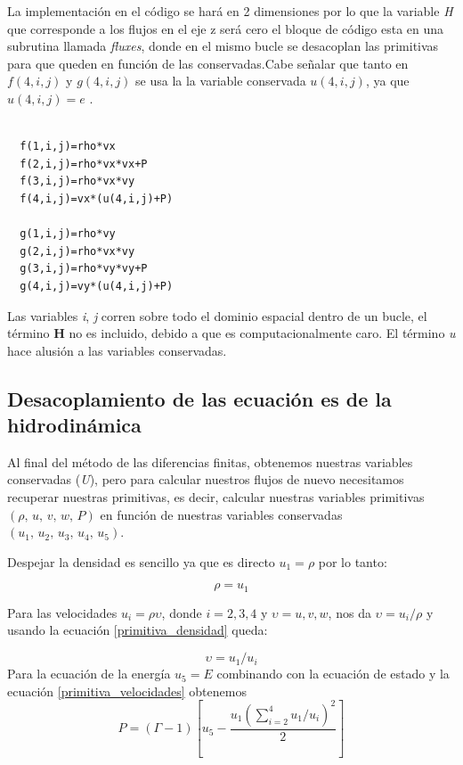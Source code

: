 \documentclass[12pt,a4paper]{book}
\begin{document}
La implementación en el código se hará en 2 dimensiones por lo que la variable \emph{H} que corresponde a los flujos en el eje z será cero el bloque de código esta en una subrutina llamada \emph{fluxes}, 
donde en el mismo bucle se desacoplan las primitivas para que queden en función de las conservadas.Cabe señalar que tanto en $f(4,i,j)$ y $g(4,i,j)$ se usa la
la variable conservada $u(4,i,j)$, ya que $u(4,i,j) = e$ . 


\begin{lstlisting}[frame=single]

  f(1,i,j)=rho*vx
  f(2,i,j)=rho*vx*vx+P
  f(3,i,j)=rho*vx*vy
  f(4,i,j)=vx*(u(4,i,j)+P)

  g(1,i,j)=rho*vy
  g(2,i,j)=rho*vx*vy
  g(3,i,j)=rho*vy*vy+P
  g(4,i,j)=vy*(u(4,i,j)+P)

\end{lstlisting}

Las variables \emph{i}, \emph{j} corren sobre todo el dominio espacial dentro de un bucle, el término $\mathbf{H}$ no es incluido, debido a que es computacionalmente 
caro. El término \emph{u} hace alusión a las variables conservadas.

\subsection{Desacoplamiento de las ecuación  es de la hidrodinámica}

Al final del método de las diferencias finitas, obtenemos nuestras variables conservadas (\emph{U}), pero para calcular nuestros flujos de nuevo necesitamos recuperar nuestras primitivas, es decir, calcular nuestras variables primitivas $(\rho, \, u, \, v,\, w, \, P )$ en función de nuestras variables conservadas $(u_1, \, u_2, \, u_3, \, u_4, \, u_5)$.

Despejar la densidad es sencillo ya que es directo $u_1= \rho$ por lo tanto:

\begin{equation}\label{primitiva_densidad}
\rho = u_1
\end{equation}

Para las velocidades $u_i=\rho \upsilon$, donde $i=2,3,4$ y $\upsilon=u,v,w$, nos da $\upsilon= u_i/ \rho$ y usando la ecuación \ref{primitiva_densidad} queda:

\begin{equation} \label{primitiva_velocidades}
\upsilon = u_1/u_i
\end{equation}
Para la ecuación   de la energía $u_5=E$ combinando con la ecuación   de estado y la ecuación \ref{primitiva_velocidades} obtenemos
\begin{equation}
P = \left( \Gamma - 1 \right) \left[ u_5 - \frac{u_1 \left( \sum_{i=2}^{4} u_1/u_i \right)^2}{2} \right]
\end{equation}
\end{document}
